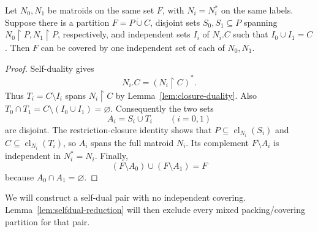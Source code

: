 \begin{lemma}\label{lem:selfdual-reduction}
Let $N_0,N_1$ be matroids on the same set $F$, with $N_i=N_i^*$
on the same labels. Suppose there is a partition
$F=P\mathbin{\dot\cup}C$, disjoint sets $S_0,S_1\subseteq P$
spanning $N_0\!\upharpoonright P,N_1\!\upharpoonright P$,
respectively, and independent sets $I_i$ of $N_i.C$ such that
$I_0\cup I_1=C$. Then $F$ can be covered by one independent set
of each of $N_0,N_1$.
\end{lemma}
\begin{proof}
Self-duality gives
\[
 N_i.C=(N_i\!\upharpoonright C)^*.
\]
Thus $T_i=C\setminus I_i$ spans $N_i\!\upharpoonright C$ by
Lemma~\ref{lem:closure-duality}. Also
$T_0\cap T_1=C\setminus(I_0\cup I_1)=\varnothing$.
Consequently the two sets
\[
 A_i=S_i\cup T_i\qquad(i=0,1)
\]
are disjoint. The restriction-closure identity shows that
$P\subseteq\operatorname{cl}_{N_i}(S_i)$ and
$C\subseteq\operatorname{cl}_{N_i}(T_i)$, so $A_i$ spans the
full matroid $N_i$. Its complement $F\setminus A_i$ is independent
in $N_i^*=N_i$. Finally,
\[
 (F\setminus A_0)\cup(F\setminus A_1)=F
\]
because $A_0\cap A_1=\varnothing$.
\end{proof}

We will construct a self-dual pair with no independent covering.
Lemma~\ref{lem:selfdual-reduction} will then exclude every mixed
packing/covering partition for that pair.
